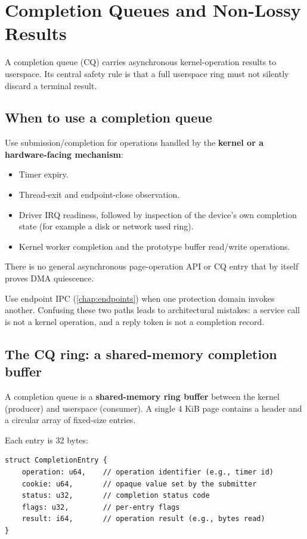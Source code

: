 \chapter{Completion Queues and Non-Lossy Results}
\label{chap:completion-queues}

A completion queue (CQ) carries asynchronous kernel-operation results to
userspace. Its central safety rule is that a full userspace ring must not silently
discard a terminal result.

\section{When to use a completion queue}

Use submission/completion for operations handled by the \textbf{kernel or a
hardware-facing mechanism}:

\begin{itemize}
    \item Timer expiry.
    \item Thread-exit and endpoint-close observation.
    \item Driver IRQ readiness, followed by inspection of the device's own
        completion state (for example a disk or network used ring).
    \item Kernel worker completion and the prototype buffer read/write operations.
\end{itemize}

There is no general asynchronous page-operation API or CQ entry that by itself
proves DMA quiescence.

Use endpoint IPC (\autoref{chap:endpoints}) when one protection domain invokes another.
Confusing these two paths leads to architectural mistakes: a service call is not a
kernel operation, and a reply token is not a completion record.

\section{The CQ ring: a shared-memory completion buffer}

A completion queue is a \textbf{shared-memory ring buffer} between the kernel
(producer) and userspace (consumer). A single 4 KiB page contains a header and a
circular array of fixed-size entries.

Each entry is 32 bytes:

\begin{lstlisting}[style=rustCode]
struct CompletionEntry {
    operation: u64,    // operation identifier (e.g., timer id)
    cookie: u64,       // opaque value set by the submitter
    status: u32,       // completion status code
    flags: u32,        // per-entry flags
    result: i64,       // operation result (e.g., bytes read)
}
\end{lstlisting}


